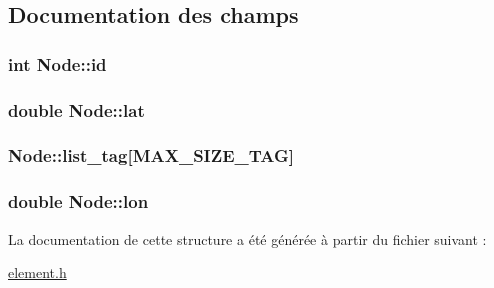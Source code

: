 \subsection{Documentation des champs}
\hypertarget{struct_node_a59a543130a10c95f1e8642cf8c5645e8_a59a543130a10c95f1e8642cf8c5645e8}{
\subsubsection[{id}]{\setlength{\rightskip}{0pt plus 5cm}int Node\-::id}}\label{struct_node_a59a543130a10c95f1e8642cf8c5645e8_a59a543130a10c95f1e8642cf8c5645e8}
\hypertarget{struct_node_a854dbe1c0bcdc8553f4d542236bedc8a_a854dbe1c0bcdc8553f4d542236bedc8a}{
\subsubsection[{lat}]{\setlength{\rightskip}{0pt plus 5cm}double Node\-::lat}}\label{struct_node_a854dbe1c0bcdc8553f4d542236bedc8a_a854dbe1c0bcdc8553f4d542236bedc8a}
\hypertarget{struct_node_ae94ee4024db0558e0b988b2be638951b_ae94ee4024db0558e0b988b2be638951b}{
\subsubsection[{list\-\_\-tag}]{ Node\-::list\-\_\-tag\mbox{[}{\bf M\-A\-X\-\_\-\-S\-I\-Z\-E\-\_\-\-T\-A\-G}\mbox{]}}}\label{struct_node_ae94ee4024db0558e0b988b2be638951b_ae94ee4024db0558e0b988b2be638951b}
\hypertarget{struct_node_a9c37e3bd5e3cf7d58097d4723ac90014_a9c37e3bd5e3cf7d58097d4723ac90014}{
\subsubsection[{lon}]{\setlength{\rightskip}{0pt plus 5cm}double Node\-::lon}}\label{struct_node_a9c37e3bd5e3cf7d58097d4723ac90014_a9c37e3bd5e3cf7d58097d4723ac90014}


La documentation de cette structure a été générée à partir du fichier suivant \-:\begin{DoxyCompactItemize}
\item 
\hyperlink{element_8h}{element.\-h}\end{DoxyCompactItemize}
